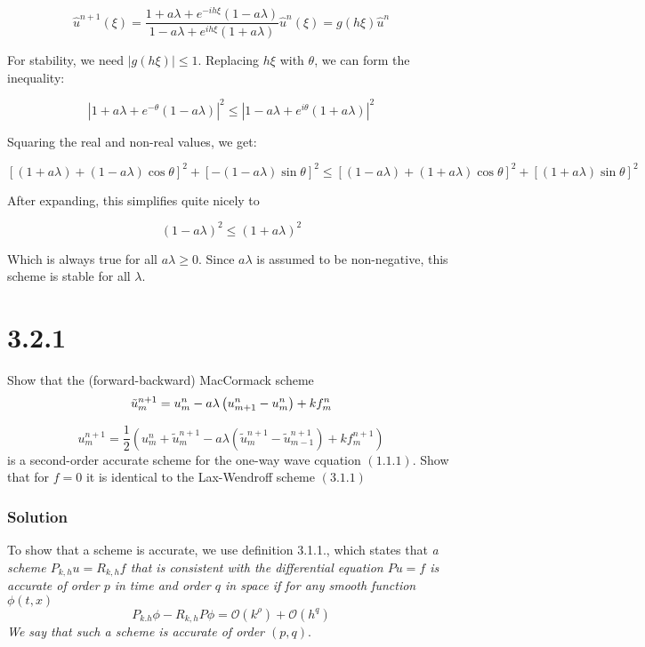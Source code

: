 \documentclass[12pt]{article}
\begin{document}
$$\hat{u}^{n+1}(\xi) = \frac{1 + {a\lambda} + e^{-ih\xi}\left(1 - a\lambda\right)}{1 - {a\lambda} + e^{ih\xi}\left(1+ {a\lambda}\right)}\hat{u}^n(\xi) = g(h\xi)\hat{u}^n$$

\noindent For stability, we need $|g(h\xi)|\leq1$. Replacing $h\xi$ with $\theta$, we can form  the inequality:

$$\left|1 + {a\lambda} + e^{-\theta}\left(1 - a\lambda\right)\right|^2 \leq \left|1 - {a\lambda} + e^{i\theta}\left(1+ {a\lambda}\right)\right|^2$$

\noindent Squaring the real and non-real values, we get:

$$ [(1+a\lambda)+(1-a\lambda)\cos\theta]^2 + [-(1-a\lambda)\sin\theta]^2 \leq [(1-a\lambda)+(1+a\lambda)\cos\theta]^2 + [(1+a\lambda)\sin\theta]^2$$

\noindent After expanding, this simplifies quite nicely to

$$ (1-a\lambda)^2 \leq (1+a\lambda)^2 $$

\noindent Which is always true for all $a\lambda \geq 0$. Since $a\lambda$ is assumed to be non-negative, this scheme is stable for all $\lambda$.

\section*{3.2.1}
Show that the (forward-backward) MacCormack scheme
$$
{\tilde{u}_{m}^{n+1}=u_{m}^{n}-a \lambda\left(u_{m+1}^{n}-u_{m}^{n}\right)+k f_{m}^{n}} \\$$

$$
{u_{m}^{n+1}=\frac{1}{2}\left(u_{m}^{n}+\tilde{u}_{m}^{n+1}-a \lambda\left(\tilde{u}_{m}^{n+1}-\tilde{u}_{m-1}^{n+1}\right)+k f_{m}^{n+1}\right)}
$$
is a second-order accurate scheme for the one-way wave cquation $(1.1 .1) .$ Show that for $f=0$ it is identical to the Lax-Wendroff scheme $(3.1 .1)$

\subsubsection*{Solution}

To show that a scheme is accurate, we use definition 3.1.1., which states that \textit{a scheme $P_{k, h} u=R_{k, h} f$ that is consistent with the differential equation $P u=f$ is accurate of order $p$ in time and order $q$ in space if for any smooth function $\phi(t, x)$
$$
P_{k . h} \phi-R_{k, h} P \phi=\mathcal{O}\left(k^{\rho}\right)+\mathcal{O}\left(h^{q}\right)
$$
We say that such a scheme is accurate of order $(p, q)$}. 
\end{document}
